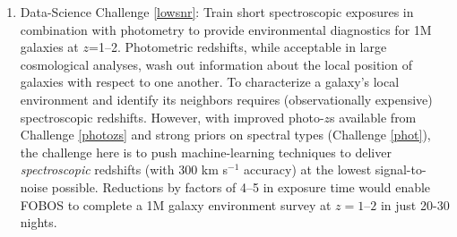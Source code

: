 \documentclass[oneside,11pt]{amsart}
\newcounter{chalno}
\newcommand{\chal}[1]{\refstepcounter{chalno}\label{#1}}
\begin{document}


\begin{enumerate}[rightmargin=0.2cm,leftmargin=0.2cm]
%
\chal{lowsnr}
%
\item[] {\textsf {\large Data-Science Challenge \ref{lowsnr}: Train
short spectroscopic exposures in combination with photometry to provide
environmental diagnostics for 1M galaxies at $z$=1--2}}.  Photometric
redshifts, while acceptable in large cosmological analyses, wash out
information about the local position of galaxies with respect to one
another.  To characterize a galaxy's local environment and identify its
neighbors requires (observationally expensive) spectroscopic redshifts.  However, with improved photo-$z$s available
from Challenge \ref{photozs} and strong priors on spectral types
(Challenge \ref{phot}), the challenge here is to push machine-learning techniques to deliver
\emph{spectroscopic} redshifts (with 300 km s$^{-1}$ accuracy) at the lowest signal-to-noise possible.  Reductions by
factors of 4--5 in exposure time would enable FOBOS to complete a 1M galaxy environment survey at $z=1$--$2$ in just
20-30 nights.

\end{enumerate}
\end{document}
